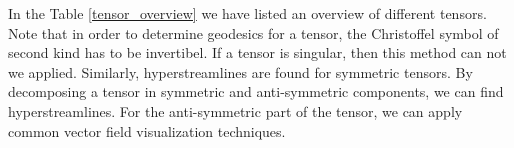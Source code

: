 \documentclass[main.tex]{subfiles}
\begin{document}
In the Table \ref{tensor_overview} we have listed an overview of different tensors. Note that in order to determine
geodesics for a tensor, the Christoffel symbol of second kind has to be invertibel. If a tensor
is singular, then this method can not we applied. Similarly, hyperstreamlines are found for
symmetric tensors. By decomposing a tensor in symmetric and anti-symmetric components, 
we can find hyperstreamlines. For the anti-symmetric part of the tensor, we can apply
common vector field visualization techniques. 
\end{document}
